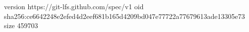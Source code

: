 version https://git-lfs.github.com/spec/v1
oid sha256:ce6642248e2efed4d2eef681b165d4209bd047e77722a77679613ade13305e73
size 459703
